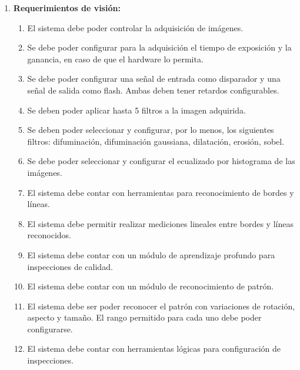 \documentclass[
11pt, %
codirector, %
]{charter}
\begin{document}
\begin{enumerate}
	\item \textbf{Requerimientos de visión:}
	\begin{enumerate}
		\item El sistema debe poder controlar la adquisición de imágenes. \REQ
		\item Se debe poder configurar para la adquisición el tiempo de exposición y la ganancia, en caso de que el hardware lo permita. \REQ
		\item Se debe poder configurar una señal de entrada como disparador y una señal de salida como flash. Ambas deben tener retardos configurables. \REQ
		\item Se deben poder aplicar hasta 5 filtros a la imagen adquirida. \REQ
		\item Se deben poder seleccionar y configurar, por lo menos, los siguientes filtros: difuminación, difuminación gaussiana, dilatación, erosión, sobel. \REQ
		\item Se debe poder seleccionar y configurar el ecualizado por histograma de las imágenes. \REQ
		\item El sistema debe contar con herramientas para reconocimiento de bordes y líneas. \REQ
		\item El sistema debe permitir realizar mediciones lineales entre bordes y líneas reconocidos. \REQ
		\item El sistema debe contar con un módulo de aprendizaje profundo para inspecciones de calidad. \REQ
		\item El sistema debe contar con un módulo de reconocimiento de patrón. \REQ
		\item El sistema debe ser poder reconocer el patrón con variaciones de rotación, aspecto y tamaño. El rango permitido para cada uno debe poder configurarse. \REQ
		\item El sistema debe contar con herramientas lógicas para configuración de inspecciones. \REQ
	\end{enumerate}
	

\end{enumerate}
\end{document}
